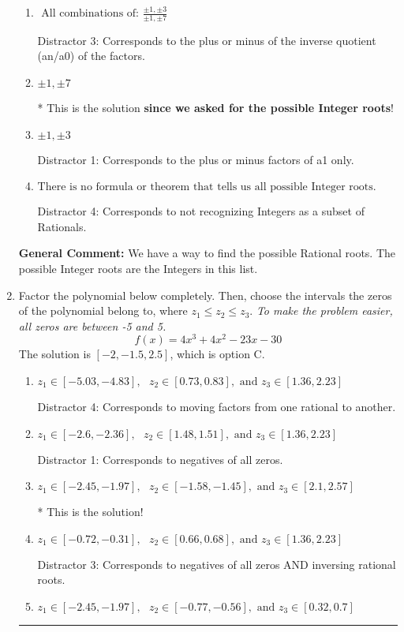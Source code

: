 \documentclass{extbook}[14pt]
\newcommand{\litem}[1]{\item #1

\rule{\textwidth}{0.4pt}}
\begin{document}
\begin{enumerate}
{\begin{enumerate}[label=\Alph*.]
This would have been the solution \textbf{if asked for the possible Rational roots}!
\item \( \text{ All combinations of: }\frac{\pm 1,\pm 3}{\pm 1,\pm 7} \)

 Distractor 3: Corresponds to the plus or minus of the inverse quotient (an/a0) of the factors. 
\item \( \pm 1,\pm 7 \)

* This is the solution \textbf{since we asked for the possible Integer roots}!
\item \( \pm 1,\pm 3 \)

 Distractor 1: Corresponds to the plus or minus factors of a1 only.
\item \( \text{There is no formula or theorem that tells us all possible Integer roots.} \)

 Distractor 4: Corresponds to not recognizing Integers as a subset of Rationals.
\end{enumerate}

\textbf{General Comment:} We have a way to find the possible Rational roots. The possible Integer roots are the Integers in this list.
}
\litem{
Factor the polynomial below completely. Then, choose the intervals the zeros of the polynomial belong to, where $z_1 \leq z_2 \leq z_3$. \textit{To make the problem easier, all zeros are between -5 and 5.}
\[ f(x) = 4x^{3} +4 x^{2} -23 x -30 \]The solution is \( [-2, -1.5, 2.5] \), which is option C.\begin{enumerate}[label=\Alph*.]
\item \( z_1 \in [-5.03, -4.83], \text{   }  z_2 \in [0.73, 0.83], \text{   and   } z_3 \in [1.36, 2.23] \)

 Distractor 4: Corresponds to moving factors from one rational to another.
\item \( z_1 \in [-2.6, -2.36], \text{   }  z_2 \in [1.48, 1.51], \text{   and   } z_3 \in [1.36, 2.23] \)

 Distractor 1: Corresponds to negatives of all zeros.
\item \( z_1 \in [-2.45, -1.97], \text{   }  z_2 \in [-1.58, -1.45], \text{   and   } z_3 \in [2.1, 2.57] \)

* This is the solution!
\item \( z_1 \in [-0.72, -0.31], \text{   }  z_2 \in [0.66, 0.68], \text{   and   } z_3 \in [1.36, 2.23] \)

 Distractor 3: Corresponds to negatives of all zeros AND inversing rational roots.
\item \( z_1 \in [-2.45, -1.97], \text{   }  z_2 \in [-0.77, -0.56], \text{   and   } z_3 \in [0.32, 0.7] \)


\end{enumerate}}
\end{enumerate}
\end{document}
